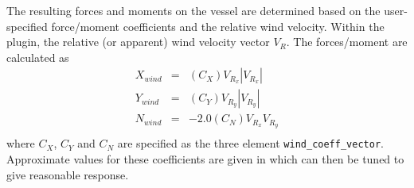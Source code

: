 \documentclass[11pt]{article}
\begin{document}
The resulting forces and moments on the vessel are determined based on the user-specified force/moment coefficients and the relative wind velocity.  Within the plugin, the relative (or apparent) wind velocity vector $V_R$.  The forces/moment are calculated as
\begin{eqnarray}
  X_{wind} &=& (C_X) V_{R_x} |V_{R_x}| \\
  Y_{wind} &=& (C_Y) V_{R_y} |V_{R_y}| \\
  N_{wind} &=& -2.0 (C_N) V_{R_x} V_{R_y} \\
\end{eqnarray}
where $C_X$, $C_Y$ and $C_N$ are specified as the three element \verb+wind_coeff_vector+.  Approximate values for these coefficients are given in \cite{sarda17station} which can then be tuned to give reasonable response.



\end{document}
